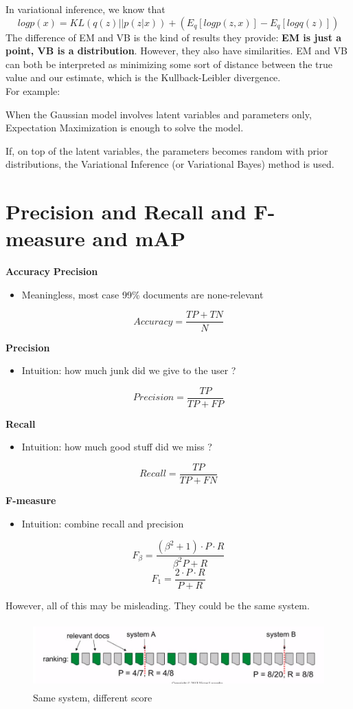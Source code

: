 \documentclass{article}
\begin{document}
In variational inference, we know that 
$$logp(x)=KL(q(z)||p(z|x))+(E_{q}[logp(z,x)]-E_{q}[logq(z)])$$
The difference of EM and VB is the kind of results they provide: \textbf{EM is just a point, VB is a distribution}. However, they also have similarities. EM and VB can both be interpreted as minimizing some sort of distance between the true value and our estimate, which is the Kullback-Leibler divergence. \\
For example:

When the Gaussian model involves latent variables and parameters only, Expectation Maximization is enough to solve the model. 

If, on top of the latent variables, the parameters becomes random with prior distributions, the Variational Inference (or Variational Bayes) method is used.

\section{Precision and Recall and F-measure and mAP}

\textbf{Accuracy}
\textbf{Precision}
\begin{itemize}
\item Meaningless, most case 99\% documents are none-relevant
\end{itemize}
$$Accuracy=\frac{TP+TN}{N}$$

\textbf{Precision}
\begin{itemize}
\item Intuition: how much junk did we give to the user ?
\end{itemize}
$$Precision=\frac{TP}{TP+FP}$$

\textbf{Recall}
\begin{itemize}
\item Intuition: how much good stuff did we miss ?
\end{itemize}
$$Recall=\frac{TP}{TP+FN}$$

\textbf{F-measure}
\begin{itemize}
\item Intuition: combine recall and precision
\end{itemize}
$$F_{\beta}=\frac{(\beta^{2}+1) \cdot P \cdot R}{\beta^{2}P+R}$$
$$F_{1}=\frac{2 \cdot P \cdot R}{P+R}$$

However, all of this may be misleading. They could be the same system.
\begin{figure}[H]
\centering
\includegraphics[width=5in,height=1in]{eval}
\caption{Same system, different score}
\end{figure}
\end{document}
